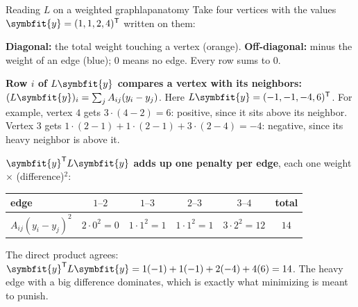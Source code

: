 \documentclass[11pt]{article}
\newcommand{\bm}[1]{\symbfit{#1}}
\newcommand{\T}{^{\mathsf T}}
\begin{document}
\begin{example}{Reading $L$ on a weighted graph}{lapanatomy}
Take four vertices with the values $\bm y=(1,1,2,4)\T$ written on them:
\begin{center}
\end{center}
\textbf{Diagonal:} the total weight touching a vertex (\textcolor{accentC}{orange}). \textbf{Off-diagonal:} minus the weight of an edge (\textcolor{dataC}{blue}); $0$ means no edge. Every row sums to $0$.

\textbf{Row $i$ of $L\bm y$ compares a vertex with its neighbors:} $(L\bm y)_i=\sum_jA_{ij}(y_i-y_j)$. Here $L\bm y=(-1,-1,-4,6)\T$. For example, vertex $4$ gets $3\cdot(4-2)=6$: positive, since it sits above its neighbor. Vertex $3$ gets $1\cdot(2-1)+1\cdot(2-1)+3\cdot(2-4)=-4$: negative, since its heavy neighbor is above it.

\textbf{$\bm y\T L\bm y$ adds up one penalty per edge}, each one weight $\times$ (difference)$^2$:
\begin{center}
\small
\renewcommand{\arraystretch}{1.2}
\begin{tabular}{lcccc|c}
\toprule
edge & $1\text{--}2$ & $1\text{--}3$ & $2\text{--}3$ & $3\text{--}4$ & total\\
\midrule
$A_{ij}(y_i-y_j)^2$ & $2\cdot0^2=0$ & $1\cdot1^2=1$ & $1\cdot1^2=1$ & $3\cdot2^2=12$ & $14$\\
\bottomrule
\end{tabular}
\end{center}
The direct product agrees: $\bm y\T L\bm y=1(-1)+1(-1)+2(-4)+4(6)=14$. The heavy edge with a big difference dominates, which is exactly what minimizing is meant to punish.
\end{example}
\end{document}
